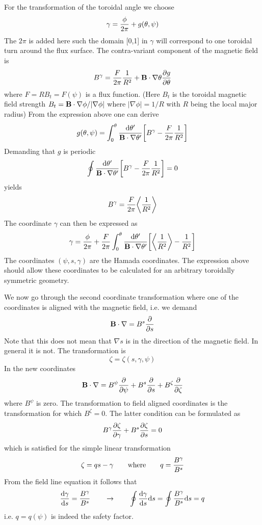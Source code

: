 \documentclass{report}
\def\be{\begin{equation}}
\def\ee{\end{equation}}
\begin{document}
For the transformation of the toroidal angle we choose 
\be 
\gamma = {\phi \over 2 \pi} + g(\theta,\psi) 
\ee
The $2\pi$ is added here such the domain [0,1] in $\gamma$ will correspond to one toroidal 
turn around the flux surface. The contra-variant component of the magnetic field is 
\be 
B^\gamma = {F \over 2\pi} {1\over R^2} + {\bf B} \cdot \nabla \theta {\partial g \over \partial 
\theta} 
\ee 
where $F = R B_t = F(\psi)$ is a flux function. (Here $B_t$ is the toroidal magnetic field 
strength $B_t = {\bf B} \cdot \nabla \phi / \vert \nabla \phi \vert$ where $\vert \nabla \phi 
\vert = 1/R$ with $R$ being the local major radius)
From the expression above one can derive 
\be 
g(\theta,\psi) = \int_0^\theta {{\rm d}\theta^\prime \over {\bf B}\cdot \nabla \theta^\prime } 
\biggl [ B^\gamma - {F \over 2\pi} {1 \over R^2} \biggr ] 
\ee 
Demanding that $g$ is periodic
\be
\oint {{\rm d}\theta^\prime \over {\bf B}\cdot 
\nabla \theta^\prime } 
\biggl [ B^\gamma - {F \over 2\pi} {1 \over R^2} \biggr ] =0
\ee
yields 
\be 
B^\gamma = {F\over 2 \pi } \biggl \langle {1\over R^2} \biggr \rangle 
\ee 
The coordinate $\gamma$ can then be expressed as 
\be 
\gamma = {\phi \over 2\pi} + {F \over 2\pi} \int_0^\theta {{\rm d} \theta^\prime \over {\bf B}
\cdot \nabla \theta^\prime} \biggl [ \biggl \langle {1\over R^2} \biggr \rangle - {1\over R^2} 
\biggr ] 
\ee 
The coordinates $(\psi,s,\gamma)$ are the Hamada coordinates. The expression above should 
allow these coordinates to be calculated for an arbitrary toroidally symmetric geometry. 

We now go through the second coordinate transformation where one of the coordinates is 
aligned with the magnetic field, i.e. we demand 
\be 
{\bf B} \cdot \nabla = B^s {\partial \over \partial s}
\ee
Note that this does not mean that $\nabla s$ is in the direction of the magnetic field. 
In general it is not. The transformation is 
\be 
\zeta = \zeta(s,\gamma,\psi) 
\ee
In the new coordinates 
\be
{\bf B}\cdot \nabla =B^{\psi}{\partial \over \partial \psi}+B^{s}{\partial \over \partial s}+
B^{\zeta}{\partial \over \partial \zeta}
\ee
where $B^\psi$ is zero. The transformation to field aligned coordinates is the transformation 
for which $B^\zeta = 0$. The latter condition can be formulated as 
\be 
B^\gamma {\partial \zeta \over \partial \gamma} + B^s {\partial \zeta \over \partial s} = 0
\ee 
which is satisfied for the simple linear transformation
\be 
\zeta =  q s - \gamma \qquad {\rm where} \qquad q = {B^\gamma \over B^s} 
\ee
From the field line equation it follows that 
\be 
{{\rm d} \gamma \over {\rm d} s} = {B^\gamma \over B^s} \qquad \rightarrow \qquad 
\oint {{\rm d} \gamma \over {\rm d} s} {\rm d} s = \oint {B^\gamma \over B^s} {\rm d} s = q 
\ee 
i.e. $q = q(\psi)$ is indeed the safety factor. 
\end{document}
